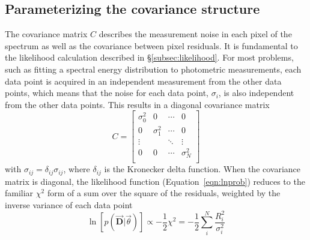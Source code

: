 \documentclass[preprint]{aastex} %
\newcommand{\vt}{\vec{\theta}}
\newcommand{\fD}{ \vec{{\bm D}}}
\begin{document}
\subsection{Parameterizing the covariance structure}
\label{subsec:covariance}
The covariance matrix $C$ describes the measurement noise in each pixel of the spectrum as well as the covariance between pixel residuals. It is fundamental to the likelihood calculation described in \S\ref{subsec:likelihood}. For most problems, such as fitting a spectral energy distribution to photometric measurements, each data point is acquired in an independent measurement from the other data points, which means that the noise for each data point, $\sigma_i$, is also independent from the other data points. This results in a diagonal covariance matrix
\begin{equation}
  C = 
  \begin{bmatrix}
    \sigma_0^2 & 0  & \cdots & 0\\
    0 & \sigma_1^2 & \cdots & 0\\
    \vdots  &   & \ddots  & \vdots \\
    0 & 0 & \cdots & \sigma_N^2\\
  \end{bmatrix}
  \label{eqn:covariance_diagonal}
\end{equation}
with $\sigma_{ij} = \delta_{ij} \sigma_{ij}$, where $\delta_{ij}$ is the Kronecker delta function. When the covariance matrix is diagonal, 
the likelihood function (Equation~\ref{eqn:lnprob}) reduces to the familiar
$\chi^2$ form of a sum over the square of the residuals, weighted by the
inverse variance of each data point
\begin{equation}
  \ln[p(\fD | \vt)] \propto - \frac{1}{2} \chi^2 = - \frac{1}{2} \sum_i^N
   \frac{R_i^2}{\sigma_i^2}
   \label{eqn:chi2}
\end{equation}
\end{document}
